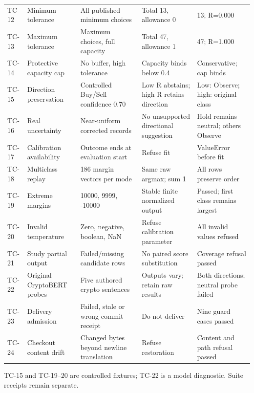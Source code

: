 \begin{longtable}{p{}p{}p{}p{}p{}}
TC-12 & Minimum tolerance & All published minimum choices & Total 13, allowance 0 & 13; R=0.000\\
TC-13 & Maximum tolerance & Maximum choices, full capacity & Total 47, allowance 1 & 47; R=1.000\\
TC-14 & Protective capacity cap & No buffer, high tolerance & Capacity binds below 0.4 & Conservative; cap binds\\
TC-15 & Direction preservation & Controlled Buy/Sell confidence 0.70 & Low R abstains; high R retains direction & Low: Observe; high: original class\\
TC-16 & Real uncertainty & Near-uniform corrected records & No unsupported directional suggestion & Hold remains neutral; others Observe\\
TC-17 & Calibration availability & Outcome ends at evaluation start & Refuse fit & ValueError before fit\\
TC-18 & Multiclass replay & 186 margin vectors per mode & Same raw argmax; sum 1 & All rows preserve order\\
TC-19 & Extreme margins & 10000, 9999, -10000 & Stable finite normalized output & Passed; first class remains largest\\
TC-20 & Invalid temperature & Zero, negative, boolean, NaN & Refuse calibration parameter & All invalid values refused\\
TC-21 & Study partial output & Failed/missing candidate rows & No paired score substitution & Coverage refusal passed\\
TC-22 & Original CryptoBERT probes & Five authored crypto sentences & Outputs vary; retain raw results & Both directions; neutral probe failed\\
TC-23 & Delivery admission & Failed, stale or wrong-commit receipt & Do not deliver & Nine guard cases passed\\
TC-24 & Checkout content drift & Changed bytes beyond newline translation & Refuse restoration & Content and path refusal passed\\
\bottomrule\end{longtable}
\endgroup
TC-15 and TC-19--20 are controlled fixtures; TC-22 is a model diagnostic. Suite receipts remain separate.

